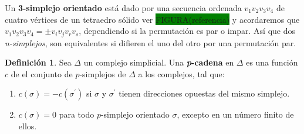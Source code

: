 \documentclass[12pt]{book}
\theoremstyle{definition}
\newtheorem{definition}[theorem]{Definición}
\newcounter{in}
\newcounter{ini}
\begin{document}
{Un \textbf{3-simplejo orientado} está dado por una secuencia ordenada
$v_{1}v_{2}v_{3}v_{4}$ de cuatro vértices de un tetraedro sólido
ver \setlength{\fboxsep}{0pt}\colorbox{green}{FIGURA(referencia)} y
acordaremos que $v_{1}v_{2}v_{3}v_{4}=\pm v_{i}v_{j}v_{r}v_{s}$,
dependiendo si la permutación es par o impar. Así que dos
\emph{n-simplejos}, son equivalentes si difieren el uno del otro
por una permutación par. 

\begin{center}
\end{center}

\begin{center}
\end{center}

\begin{center}
\end{center}

\begin{definition}
  Sea $\Delta$ un complejo simplicial. Una \textbf{\emph{p}-cadena} en
  $\Delta$ es una función $c$ de el conjunto de $p$-simplejos de
  $\Delta$ a los complejos, tal que:
  \begin{enumerate}
    \item $c(\sigma)=-c(\sigma^{'})$ si $\sigma$ y $\sigma^{'}$ tienen
      direcciones opuestas del mismo simplejo.
    \item $c(\sigma)=0$ para todo $p$-simplejo orientado $\sigma$,
      excepto en un número finito de ellos.
  \end{enumerate} 
\end{definition}

}
\end{document}
